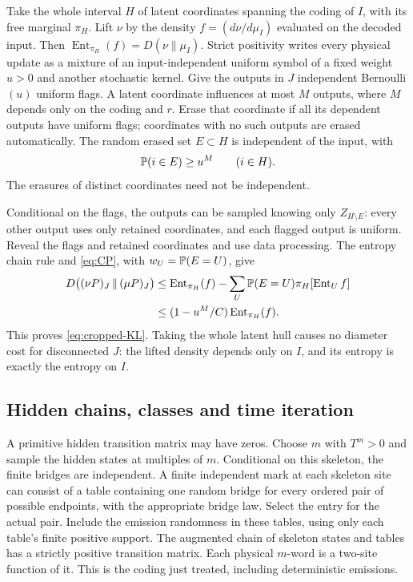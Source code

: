 Take the whole interval \(H\) of latent coordinates spanning the coding of \(I\), with its free marginal \(\pi_H\). Lift \(\nu\) by the density
\(f=(d\nu/d\mu_I)\) evaluated on the decoded input. Then
\(\operatorname{Ent}_{\pi_H}(f)=D(\nu\|\mu_I)\).
Strict positivity writes every physical update as a mixture of an input-independent uniform symbol of a fixed weight \(u>0\) and another stochastic kernel. Give the outputs in \(J\) independent Bernoulli\((u)\) uniform flags. A latent coordinate influences at most \(M\) outputs, where \(M\) depends only on the coding and \(r\). Erase that coordinate if all its dependent outputs have uniform flags; coordinates with no such outputs are erased automatically. The random erased set \(E\subset H\) is independent of the input, with
\[
 \mathbb P(i\in E)\ge u^M\qquad(i\in H).
\]
The erasures of distinct coordinates need not be independent.

Conditional on the flags, the outputs can be sampled knowing only \(Z_{H\setminus E}\): every other output uses only retained coordinates, and each flagged output is uniform. Reveal the flags and retained coordinates and use data processing. The entropy chain rule and \eqref{eq:CP}, with \(w_U=\mathbb P(E=U)\), give
\[
\begin{split}
 D\bigl((\nu P)_J\,\|\,(\mu P)_J\bigr)
 &\le \operatorname{Ent}_{\pi_H}(f)
       -\sum_U\mathbb P(E=U)\pi_H[\operatorname{Ent}_U f]\\
 &\le(1-u^M/C)\operatorname{Ent}_{\pi_H}(f).
\end{split}
\]
This proves \eqref{eq:cropped-KL}. Taking the whole latent hull causes no diameter cost for disconnected \(J\): the lifted density depends only on \(I\), and its entropy is exactly the entropy on \(I\).

\subsection{Hidden chains, classes and time iteration}

A primitive hidden transition matrix may have zeros. Choose \(m\) with \(T^m>0\) and sample the hidden states at multiples of \(m\). Conditional on this skeleton, the finite bridges are independent. A finite independent mark at each skeleton site can consist of a table containing one random bridge for every ordered pair of possible endpoints, with the appropriate bridge law. Select the entry for the actual pair. Include the emission randomness in these tables, using only each table's finite positive support. The augmented chain of skeleton states and tables has a strictly positive transition matrix. Each physical \(m\)-word is a two-site function of it. This is the coding just treated, including deterministic emissions.

